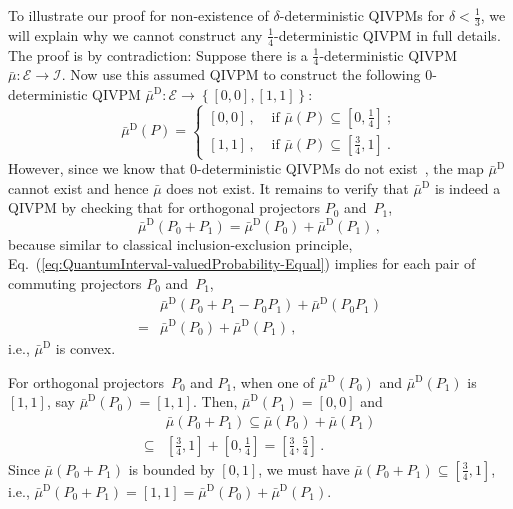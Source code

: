 \documentclass[english,reprint, aps, prl,superscriptaddress, showpacs,
showkeys, longbibliography, amsmath, amssymb, floatfix]{revtex4-1}
\theoremstyle{plain}
\theoremstyle{definition}
\newcommand{\events}{\ensuremath{\mathcal{E}}}
\newcommand{\imposs}{\ensuremath{\left[0,0\right]}}
\newcommand{\necess}{\ensuremath{\left[1,1\right]}}
\begin{document}
To illustrate our proof for non-existence of $\delta$-deterministic
QIVPMs for $\delta<\frac{1}{3}$, we will explain why we cannot construct
any $\frac{1}{4}$-deterministic QIVPM in full details. The proof
is by contradiction: Suppose there is a $\frac{1}{4}$-deterministic
QIVPM~$\bar{\mu}:\events\rightarrow\mathscr{I}$. Now use this assumed
QIVPM to construct the following $0$-deterministic QIVPM $\bar{\mu}^{\textrm{D}}:\events\rightarrow\left\{ \imposs,\necess\right\} $:
\begin{equation}
\bar{\mu}^{\textrm{D}}\left(P\right)=\begin{cases}
\imposs\,, & \textrm{ if }\bar{\mu}\left(P\right)\subseteq\left[0,\tfrac{1}{4}\right]\:;\\
\necess\,, & \textrm{ if }\bar{\mu}\left(P\right)\subseteq\left[\tfrac{3}{4},1\right]\:.
\end{cases}
\end{equation}
However, since we know that $0$-deterministic QIVPMs do not exist~\cite{THOS2017},
the map $\bar{\mu}^{\textrm{D}}$ cannot exist and hence $\bar{\mu}$
does not exist. It remains to verify that $\bar{\mu}^{\textrm{D}}$
is indeed a QIVPM by checking that for orthogonal projectors $P_{0}$
and~$P_{1}$, 
\begin{equation}
\bar{\mu}^{\textrm{D}}\left(P_{0}+P_{1}\right)=\bar{\mu}^{\textrm{D}}\left(P_{0}\right)+\bar{\mu}^{\textrm{D}}\left(P_{1}\right)\,,\label{eq:QuantumInterval-valuedProbability-Equal}
\end{equation}
because similar to classical inclusion-exclusion principle, Eq.~(\ref{eq:QuantumInterval-valuedProbability-Equal})
implies for each pair of commuting projectors $P_{0}$ and~$P_{1}$,
\begin{equation}
\begin{aligned} & \bar{\mu}^{\textrm{D}}\left(P_{0}+P_{1}-P_{0}P_{1}\right)+\bar{\mu}^{\textrm{D}}\left(P_{0}P_{1}\right)\\
={} & \bar{\mu}^{\textrm{D}}\left(P_{0}\right)+\bar{\mu}^{\textrm{D}}\left(P_{1}\right)\,,
\end{aligned}
\end{equation}
i.e., $\bar{\mu}^{\textrm{D}}$ is convex.

For orthogonal projectors~$P_{0}$ and $P_{1}$, when one of $\bar{\mu}^{\textrm{D}}\left(P_{0}\right)$
and $\bar{\mu}^{\textrm{D}}\left(P_{1}\right)$ is $\necess$, say
$\bar{\mu}^{\textrm{D}}\left(P_{0}\right)=\necess$. Then, $\bar{\mu}^{\textrm{D}}\left(P_{1}\right)=\imposs$
and 
\begin{equation}
\begin{aligned} & \bar{\mu}\left(P_{0}+P_{1}\right)\subseteq\bar{\mu}\left(P_{0}\right)+\bar{\mu}\left(P_{1}\right)\\
\subseteq{} & \left[\tfrac{3}{4},1\right]+\left[0,\tfrac{1}{4}\right]=\left[\tfrac{3}{4},\tfrac{5}{4}\right]\,.
\end{aligned}
\end{equation}
Since $\bar{\mu}\left(P_{0}+P_{1}\right)$ is bounded by $\left[0,1\right]$,
we must have $\bar{\mu}\left(P_{0}+P_{1}\right)\subseteq\left[\frac{3}{4},1\right]$,
i.e., $\bar{\mu}^{\textrm{D}}\left(P_{0}+P_{1}\right)=\necess=\bar{\mu}^{\textrm{D}}\left(P_{0}\right)+\bar{\mu}^{\textrm{D}}\left(P_{1}\right)$.
\end{document}
